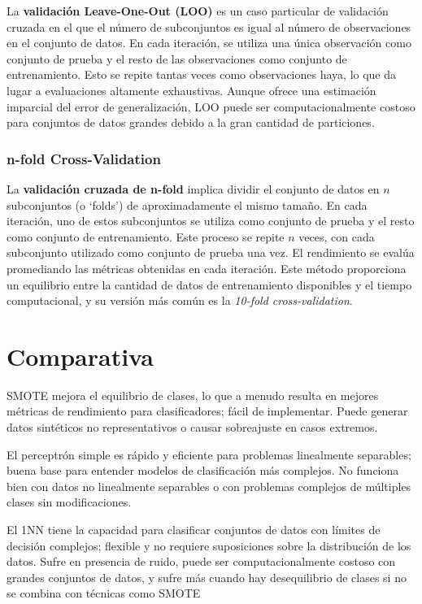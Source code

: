 \documentclass{article}
\begin{document}
La \textbf{validación Leave-One-Out (LOO)} es un caso particular de validación cruzada en el que el número de subconjuntos es igual al número de observaciones en el conjunto de datos. En cada iteración, se utiliza una única observación como conjunto de prueba y el resto de las observaciones como conjunto de entrenamiento. Esto se repite tantas veces como observaciones haya, lo que da lugar a evaluaciones altamente exhaustivas. Aunque ofrece una estimación imparcial del error de generalización, LOO puede ser computacionalmente costoso para conjuntos de datos grandes debido a la gran cantidad de particiones.

\subsubsection{n-fold Cross-Validation}

La \textbf{validación cruzada de n-fold} implica dividir el conjunto de datos en \(n\) subconjuntos (o `folds') de aproximadamente el mismo tamaño. En cada iteración, uno de estos subconjuntos se utiliza como conjunto de prueba y el resto como conjunto de entrenamiento. Este proceso se repite \(n\) veces, con cada subconjunto utilizado como conjunto de prueba una vez. El rendimiento se evalúa promediando las métricas obtenidas en cada iteración. Este método proporciona un equilibrio entre la cantidad de datos de entrenamiento disponibles y el tiempo computacional, y su versión más común es la \textit{10-fold cross-validation}.

\section{Comparativa}
SMOTE mejora el equilibrio de clases, lo que a menudo resulta en mejores métricas de rendimiento para clasificadores; fácil de implementar. Puede generar datos sintéticos no representativos o causar sobreajuste en casos extremos.

El perceptrón simple es rápido y eficiente para problemas linealmente separables; buena base para entender modelos de clasificación más complejos. No funciona bien con datos no linealmente separables o con problemas complejos de múltiples clases sin modificaciones.

El 1NN tiene la capacidad para clasificar conjuntos de datos con límites de decisión complejos; flexible y no requiere suposiciones sobre la distribución de los datos. Sufre en presencia de ruido, puede ser computacionalmente costoso con grandes conjuntos de datos, y sufre más cuando hay desequilibrio de clases si no se combina con técnicas como SMOTE
\end{document}
